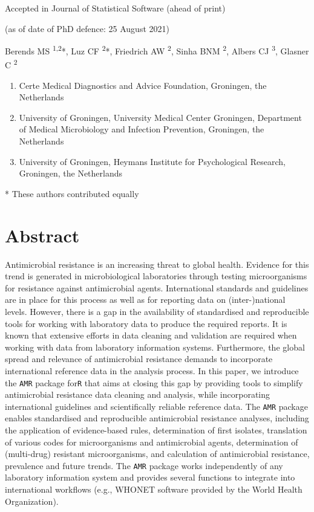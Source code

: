 \documentclass[
]{book}
\providecommand{\tightlist}{%
  \setlength{\itemsep}{0pt}\setlength{\parskip}{0pt}}
\begin{document}
Accepted in Journal of Statistical Software (ahead of print)

(as of date of PhD defence: 25 August 2021)

Berends MS \textsuperscript{1,2}*, Luz CF \textsuperscript{2}*, Friedrich AW \textsuperscript{2}, Sinha BNM \textsuperscript{2}, Albers CJ \textsuperscript{3}, Glasner C \textsuperscript{2}

\begin{enumerate}
\def\labelenumi{\arabic{enumi}.}
\tightlist
\item
  Certe Medical Diagnostics and Advice Foundation, Groningen, the Netherlands
\item
  University of Groningen, University Medical Center Groningen, Department of Medical Microbiology and Infection Prevention, Groningen, the Netherlands
\item
  University of Groningen, Heymans Institute for Psychological Research, Groningen, the Netherlands
\end{enumerate}

* These authors contributed equally

\hypertarget{abstract-2}{%
\section*{Abstract}\label{abstract-2}}

Antimicrobial resistance is an increasing threat to global health. Evidence for this trend is generated in microbiological laboratories through testing microorganisms for resistance against antimicrobial agents. International standards and guidelines are in place for this process as well as for reporting data on (inter-)national levels. However, there is a gap in the availability of standardised and reproducible tools for working with laboratory data to produce the required reports. It is known that extensive efforts in data cleaning and validation are required when working with data from laboratory information systems. Furthermore, the global spread and relevance of antimicrobial resistance demands to incorporate international reference data in the analysis process. In this paper, we introduce the \texttt{AMR} package for\texttt{R} that aims at closing this gap by providing tools to simplify antimicrobial resistance data cleaning and analysis, while incorporating international guidelines and scientifically reliable reference data. The \texttt{AMR} package enables standardised and reproducible antimicrobial resistance analyses, including the application of evidence-based rules, determination of first isolates, translation of various codes for microorganisms and antimicrobial agents, determination of (multi-drug) resistant microorganisms, and calculation of antimicrobial resistance, prevalence and future trends. The \texttt{AMR} package works independently of any laboratory information system and provides several functions to integrate into international workflows (e.g., WHONET software provided by the World Health Organization).
\end{document}
